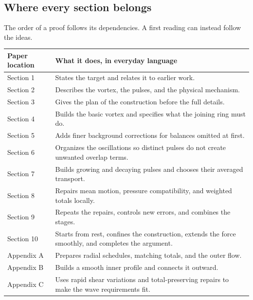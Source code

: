 \documentclass[
  english,
  11pt,
]{article}
\newcounter{none} %
\begin{document}
\subsection{Where every section
belongs}\label{where-every-section-belongs}

The order of a proof follows its dependencies. A first reading can
instead follow the ideas.

{\def\LTcaptype{none} %
\begin{longtable}[]{@{}
  >{\raggedright\arraybackslash}p{}
  >{\raggedright\arraybackslash}p{}@{}}
\toprule\noalign{}
\begin{minipage}[b]{\linewidth}\raggedright
Paper location
\end{minipage} & \begin{minipage}[b]{\linewidth}\raggedright
What it does, in everyday language
\end{minipage} \\
\midrule\noalign{}
\endhead
\bottomrule\noalign{}
\endlastfoot
Section 1 & States the target and relates it to earlier work. \\
Section 2 & Describes the vortex, the pulses, and the physical
mechanism. \\
Section 3 & Gives the plan of the construction before the full
details. \\
Section 4 & Builds the basic vortex and specifies what the joining ring
must do. \\
Section 5 & Adds finer background corrections for balances omitted at
first. \\
Section 6 & Organizes the oscillations so distinct pulses do not create
unwanted overlap terms. \\
Section 7 & Builds growing and decaying pulses and chooses their
averaged transport. \\
Section 8 & Repairs mean motion, pressure compatibility, and weighted
totals locally. \\
Section 9 & Repeats the repairs, controls new errors, and combines the
stages. \\
Section 10 & Starts from rest, confines the construction, extends the
force smoothly, and completes the argument. \\
Appendix A & Prepares radial schedules, matching totals, and the outer
flow. \\
Appendix B & Builds a smooth inner profile and connects it outward. \\
Appendix C & Uses rapid shear variations and total-preserving repairs to
make the wave requirements fit. \\
\end{longtable}
}
\end{document}
